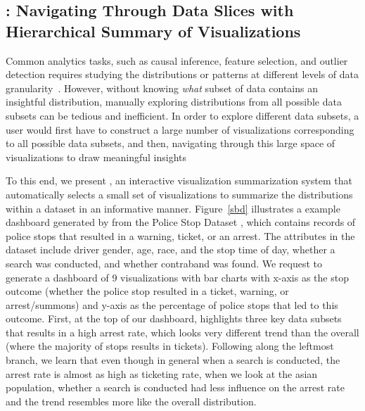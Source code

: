 \subsection{\sbd: Navigating Through Data Slices with Hierarchical Summary of Visualizations}
\par Common analytics tasks, such as causal inference, feature selection, and outlier detection requires studying the distributions or patterns at different levels of data granularity~\cite{Anand2015,Wu2013,Heer2012}. However, without knowing \textit{what} subset of data contains an insightful distribution, manually exploring distributions from all possible data subsets can be tedious and inefficient. In order to explore different data subsets, a user would first have to construct a large number of visualizations corresponding to all possible data subsets, and then, navigating through this large space of visualizations to draw meaningful insights
\par To this end, we present \sbd, an interactive visualization summarization system that automatically selects a small set of visualizations to summarize the distributions within a dataset in an informative manner. Figure~\ref{sbd} illustrates a example dashboard generated by \sbd from the Police Stop Dataset \cite{police}, which contains records of police stops that resulted in a warning, ticket, or an arrest. The attributes in the dataset include driver gender, age, race, and the stop time of day, whether a search was conducted, and whether contraband was found. We request \sbd to generate a dashboard of 9 visualizations with bar charts with x-axis as the stop outcome (whether the police stop resulted in a ticket, warning, or arrest/summons) and y-axis as the percentage of police stops that led to this outcome. First, at the top of our dashboard, \sbd highlights three key data subsets that results in a high arrest rate, which looks very different trend than the overall (where the majority of stops results in tickets). Following along the leftmost branch, we learn that even though in general when a search is conducted, the arrest rate is almost as high as ticketing rate, when we look at the asian population, whether a search is conducted had less influence on the arrest rate and the trend resembles more like the overall distribution.

